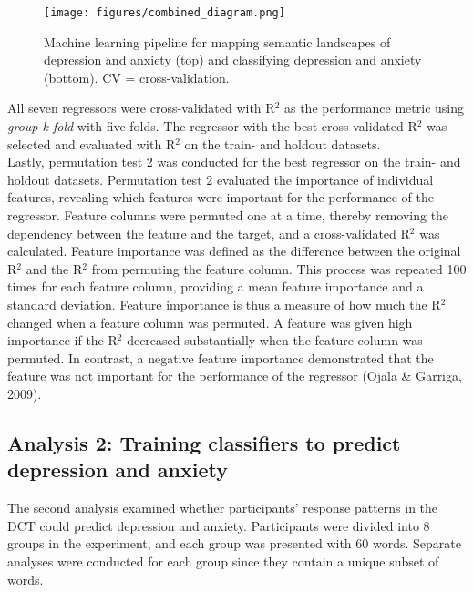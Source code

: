 \documentclass[11pt, a4paper]{article}
\begin{document}
\begin{figure}
\centering
\texttt{[image: figures/combined\_diagram.png]}
\caption{\label{fig:data} Machine learning pipeline for mapping semantic landscapes of depression and anxiety (top) and classifying depression and anxiety (bottom). CV = cross-validation.}
\end{figure}

All seven regressors were cross-validated with R$^2$ as the performance metric using \textit{group-k-fold} with five folds. The regressor with the best cross-validated R$^2$ was selected and evaluated with R$^2$ on the train- and holdout datasets. \\

Lastly, permutation test 2 was conducted for the best regressor on the train- and holdout datasets. Permutation test 2 evaluated the importance of individual features, revealing which features were important for the performance of the regressor. Feature columns were permuted one at a time, thereby removing the dependency between the feature and the target, and a cross-validated R$^2$ was calculated. Feature importance was defined as the difference between the original R$^2$ and the R$^2$ from permuting the feature column. This process was repeated 100 times for each feature column, providing a mean feature importance and a standard deviation. Feature importance is thus a measure of how much the R$^2$ changed when a feature column was permuted. A feature was given high importance if the R$^2$ decreased substantially when the feature column was permuted. In contrast, a negative feature importance demonstrated that the feature was not important for the performance of the regressor (Ojala \& Garriga, 2009).


\subsection{Analysis 2: Training classifiers to predict depression and anxiety}
The second analysis examined whether participants’ response patterns in the DCT could predict depression and anxiety. Participants were divided into 8 groups in the experiment, and each group was presented with 60 words. Separate analyses were conducted for each group since they contain a unique subset of words.\\
\end{document}
